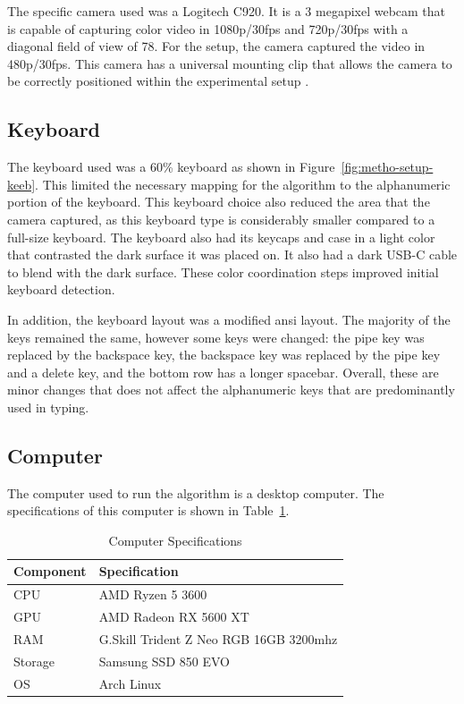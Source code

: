 \documentclass{report}
\begin{document}
The specific camera used was a Logitech C920. It is a 3 megapixel webcam that
is capable of capturing color video in 1080p/30fps and 720p/30fps with a
diagonal field of view of 78\degree. For the setup, the camera captured the
video in 480p/30fps. This camera has a universal mounting clip that allows the
camera to be correctly positioned within the experimental setup
\parencite{logitech}.

\subsection{Keyboard}
\label{section:metho-keeb}

The keyboard used was a 60\% keyboard as shown in
Figure~\ref{fig:metho-setup-keeb}. This limited the necessary mapping for the
algorithm to the alphanumeric portion of the keyboard. This keyboard choice also
reduced the area that the camera captured, as this keyboard type is considerably
smaller compared to a full-size keyboard. The keyboard also had its keycaps and
case in a light color that contrasted the dark surface it was placed on. It also
had a dark USB-C cable to blend with the dark surface. These color coordination
steps improved initial keyboard detection.

In addition, the keyboard layout was a modified \ac{ansi} layout. The majority
of the keys remained the same, however some keys were changed: the pipe key was
replaced by the backspace key, the backspace key was replaced by the pipe key
and a delete key, and the bottom row has a longer spacebar. Overall, these are
minor changes that does not affect the alphanumeric keys that are predominantly
used in typing.

\subsection{Computer}
The computer used to run the algorithm is a desktop computer. The specifications
of this computer is shown in Table~\ref{tab:table-specs}.

\begin{table}[H]
	\small
	\centering
	\caption{\label{tab:table-specs}Computer Specifications}
	\begin{tabular}{ p{} p{} }
		\toprule
		Component & Specification                          \\
		\midrule
		CPU       & AMD Ryzen 5 3600                       \\
		GPU       & AMD Radeon RX 5600 XT                  \\
		RAM       & G.Skill Trident Z Neo RGB 16GB 3200mhz \\
		Storage   & Samsung SSD 850 EVO                    \\
		OS        & Arch Linux                             \\
		\bottomrule
	\end{tabular}
\end{table}
\end{document}
